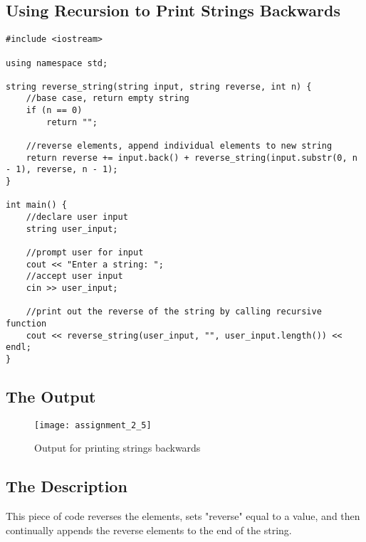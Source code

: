 \documentclass[11pt]{article}
\begin{document}
\subsection*{Using Recursion to Print Strings Backwards}
\begin{lstlisting}
#include <iostream>

using namespace std;

string reverse_string(string input, string reverse, int n) {
    //base case, return empty string
    if (n == 0)
        return "";

    //reverse elements, append individual elements to new string
    return reverse += input.back() + reverse_string(input.substr(0, n - 1), reverse, n - 1);
}

int main() {
    //declare user input
    string user_input;

    //prompt user for input
    cout << "Enter a string: ";
    //accept user input
    cin >> user_input;

    //print out the reverse of the string by calling recursive function
    cout << reverse_string(user_input, "", user_input.length()) << endl;
}
\end{lstlisting}

\subsection*{The Output}
\begin{figure}[H]
    \centering
    \texttt{[image: assignment\_2\_5]}
    \caption{Output for printing strings backwards}
    \label{fig:part 5}
\end{figure}

\subsection*{The Description}
This piece of code reverses the elements, sets "reverse" equal to a value, and then continually appends the reverse elements to the end of the string.
\end{document}

